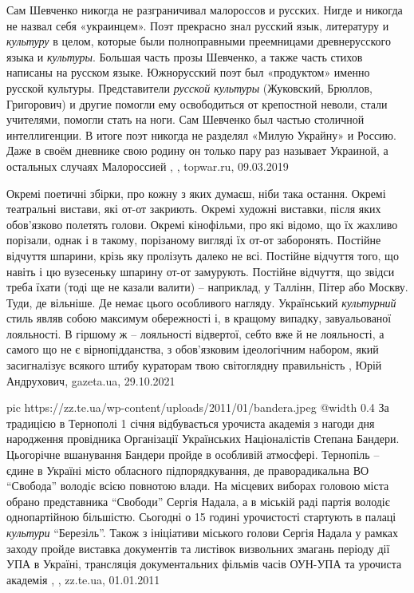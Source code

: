 Сам Шевченко никогда не разграничивал малороссов и русских. Нигде и никогда не
назвал себя «украинцем». Поэт прекрасно знал русский язык, литературу и
\emph{культуру} в целом, которые были полноправными преемницами древнерусского языка и
\emph{культуры}. Большая часть прозы Шевченко, а также часть стихов написаны на
русском языке. Южнорусский поэт был «продуктом» именно русской культуры.
Представители \emph{русской культуры} (Жуковский, Брюллов, Григорович) и другие
помогли ему освободиться от крепостной неволи, стали учителями, помогли стать
на ноги. Сам Шевченко был частью столичной интеллигенции. В итоге поэт никогда
не разделял «Милую Украйну» и Россию. Даже в своём дневнике свою родину он
только пару раз называет Украиной, а остальных случаях Малороссией
, , topwar.ru, 09.03.2019

Окремі поетичні збірки, про кожну з яких думаєш, ніби така остання.  Окремі
театральні вистави, які от-от закриють.  Окремі художні виставки, після яких
обов'язково полетять голови.  Окремі кінофільми, про які відомо, що їх жахливо
порізали, однак і в такому, порізаному вигляді їх от-от заборонять.  Постійне
відчуття шпарини, крізь яку пролізуть далеко не всі.  Постійне відчуття того,
що навіть і цю вузесеньку шпарину от-от замурують.  Постійне відчуття, що
звідси треба їхати (тоді ще не казали валити) – наприклад, у Таллінн, Пітер або
Москву. Туди, де вільніше. Де немає цього особливого нагляду.  Український
\emph{культурний} стиль являв собою максимум обережності і, в кращому випадку,
завуальованої лояльності. В гіршому ж – лояльності відвертої, себто вже й не
лояльності, а самого що не є вірнопідданства, з обов'язковим ідеологічним
набором, який засигналізує всякого штибу кураторам твою світоглядну
правильність
, 
Юрій Андрухович, gazeta.ua, 29.10.2021

\ifcmt
  pic https://zz.te.ua/wp-content/uploads/2011/01/bandera.jpeg
  @width 0.4
\fi
За традицією в Тернополі 1 січня відбувається урочиста академія з нагоди дня
народження провідника Організації Українських Націоналістів  Степана Бандери.
Цьогорічне вшанування Бандери пройде в особливій атмосфері. Тернопіль – єдине в
Україні місто обласного підпорядкування, де праворадикальна ВО \enquote{Свобода}
володіє всією повнотою влади. На місцевих виборах головою міста обрано
представника \enquote{Свободи} Сергія Надала, а в міській раді партія володіє
однопартійною більшістю.  Сьогодні о 15 годині урочистості стартують в палаці
\emph{культури} \enquote{Березіль}.  Також з ініціативи міського голови Сергія
Надала у рамках заходу пройде виставка документів та листівок визвольних
змагань періоду дії УПА в Україні, трансляція документальних фільмів часів
ОУН-УПА та урочиста академія
, 
, zz.te.ua, 01.01.2011
